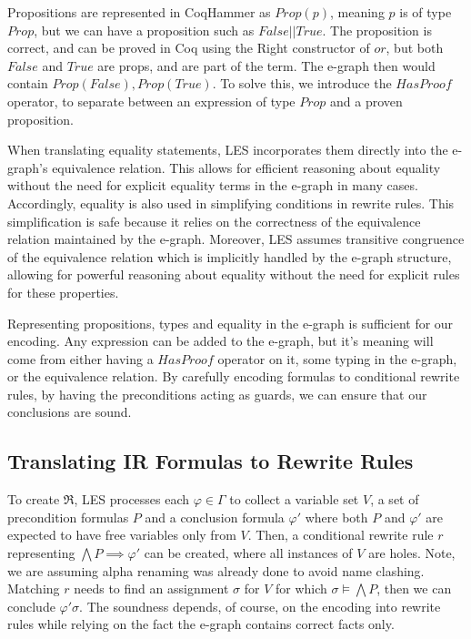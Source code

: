 Propositions are represented in CoqHammer as $Prop(p)$, meaning $p$ is of type $Prop$, but we can have a proposition such as $False || True$. 
The proposition is correct, and can be proved in Coq using the Right constructor of $or$, but both $False$ and $True$ are props, and are part of the term.
The e-graph then would contain $Prop(False),Prop(True)$.
To solve this, we introduce the $HasProof$ operator, to separate between an expression of type $Prop$ and a proven proposition.

When translating equality statements, LES incorporates them directly into the e-graph's equivalence relation.
This allows for efficient reasoning about equality without the need for explicit equality terms in the e-graph in many cases.
Accordingly, equality is also used in simplifying conditions in rewrite rules.
This simplification is safe because it relies on the correctness of the equivalence relation maintained by the e-graph.
Moreover, LES assumes transitive congruence of the equivalence relation which is implicitly handled by the e-graph structure, allowing for powerful reasoning about equality without the need for explicit rules for these properties. 

Representing propositions, types and equality in the e-graph is sufficient for our encoding.
Any expression can be added to the e-graph, but it's meaning will come from either having a $HasProof$ operator on it, some typing in the e-graph, or the equivalence relation.
By carefully encoding formulas to conditional rewrite rules, by having the preconditions acting as guards, we can ensure that our conclusions are sound.

\subsection{Translating IR Formulas to Rewrite Rules}
\label{translation:les:rwrules}

To create $\Re$, LES processes each $\varphi \in \Gamma$ to collect a variable set $V$, a set of precondition formulas $P$ and a conclusion formula $\varphi'$ where both $P$ and $\varphi'$ are expected to have free variables only from $V$.
Then, a conditional rewrite rule $r$ representing $\bigwedge P \implies \varphi'$ can be created, where all instances of $V$ are holes.
Note, we are assuming alpha renaming was already done to avoid name clashing.
Matching $r$ needs to find an assignment $\sigma$ for $V$ for which $\sigma \models \bigwedge P$, then we can conclude $\varphi'\sigma$.
The soundness depends, of course, on the encoding into rewrite rules while relying on the fact the e-graph contains correct facts only.

